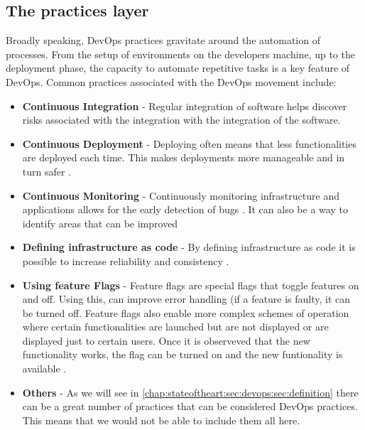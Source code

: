       \subsection{The practices layer} \label{chap:stateoftheart:sec:devops:sec:practices}
      Broadly speaking, DevOps practices gravitate around the automation of processes. From the setup of environments on the developers machine, up to the deployment phase, the capacity to automate repetitive tasks is a key feature of DevOps.
      Common practices associated with the DevOps movement include:
      \begin{itemize}
        \item \textbf{Continuous Integration} - Regular integration of software helps discover risks associated with the integration with the integration of the software. \cite{And2015}
        \item \textbf{Continuous Deployment} - Deploying often means that less functionalities are deployed each time. This makes deployments more manageable and in turn safer \cite{Allspaw}.
        \item \textbf{Continuous Monitoring} - Continuously monitoring infrastructure and applications allows for the early detection of bugs \cite{Cukier2013}. It can also be a way to identify areas that can be improved \cite{Willis2010}
        \item \textbf{Defining infrastructure as code} - By defining infrastructure as code it is possible to increase reliability and consistency \cite{Loukides2012}.
        \item \textbf{Using feature Flags} - Feature flags are special flags that toggle features on and off. Using this, can improve error handling (if a feature is faulty, it can be turned off. Feature flags also enable more complex schemes of operation where certain functionalities are launched but are not displayed or are displayed just to certain users. Once it is observeved that the new functionality works, the flag can be turned on and the new funtionality is available \cite{Bass}.
        \item \textbf{Others} - As we will see in \ref{chap:stateoftheart:sec:devops:sec:definition} there can be a great number of practices that can be considered DevOps practices. This means that we would not be able to include them all here.
      \end{itemize}

